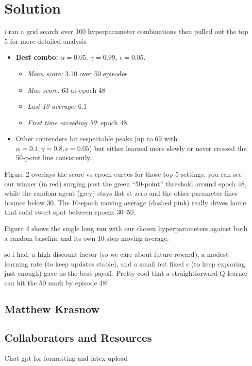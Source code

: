 \documentclass[submit]{../harvardml}
\newenvironment{solution}
  {\color{blue}\section*{Solution}}
{}
\begin{document}
\begin{solution}
  i ran a grid search over 100 hyperparameter combinations then pulled out the top 5 for more detailed analysis
  
  \begin{itemize}
    \item \textbf{Best combo:} $\alpha=0.05,\ \gamma=0.99,\ \epsilon=0.05$.  
      \begin{itemize}
        \item \emph{Mean score:} 3.10 over 50 episodes  
        \item \emph{Max score:} 63 at epoch 48  
        \item \emph{Last‐10 average:} 6.1  
        \item \emph{First time exceeding 50:} epoch 48  
      \end{itemize}
    \item Other contenders hit respectable peaks (up to 69 with $\alpha=0.1,\gamma=0.8,\epsilon=0.05$) but either learned more slowly or never crossed the 50‐point line consistently.
  \end{itemize}
  
  Figure 2 overlays the score‐vs‐epoch curves for those top‐5 settings: you can see our winner (in red) surging past the green “50‐point” threshold around epoch 48, while the random agent (grey) stays flat at zero and the other parameter lines bounce below 30.  The 10-epoch moving average (dashed pink) really drives home that solid sweet spot between epochs 30–50.
  
  Figure 4 shows the single long run with our chosen hyperparameters against both a random baseline and its own 10-step moving average.
  
   so i had: a high discount factor (so we care about future reward), a modest learning rate (to keep updates stable), and a small but fixed $\epsilon$ (to keep exploring just enough) gave us the best payoff.  Pretty cool that a straightforward Q‐learner can hit the 50 mark by episode 48!
  \end{solution}
  

\newpage
\newpage
\subsection*{Matthew Krasnow}
\subsection*{Collaborators and Resources}
Chat gpt for formatting and latex upload
\end{document}
